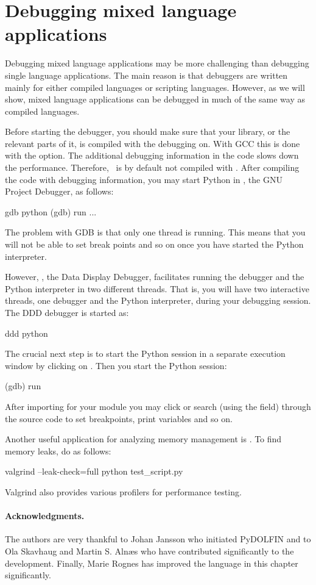 \section{Debugging mixed language applications}

Debugging mixed language applications may be more challenging than debugging
single language applications.  The main reason is that debuggers are written
mainly for either compiled languages or scripting languages. However, as
we will show, mixed language applications can be debugged in much of the same way
as compiled languages. 

Before starting the debugger, you should make sure that your library, 
or the relevant parts of it, 
is compiled with the debugging on. With GCC this is done with the 
option. The additional debugging information in the code slows down 
the performance. Therefore, \dolfin\ is by default not compiled with
.   
After compiling the code with debugging information, you may start 
Python in \citet{www:gdb}, the GNU Project Debugger, as follows:     
\begin{bash}
gdb python
(gdb) run
...
\end{bash}
The problem with GDB is that only one thread is running. This means that
you will not be able to set break points and so on once you have started
the Python interpreter.  

However, \citet{www:ddd}, the Data Display Debugger, facilitates running the debugger and the Python
interpreter in two different threads. That is, you will have two interactive
threads, one debugger and the Python interpreter,  during your debugging
session. The DDD debugger is started as:    
\begin{bash}
ddd python
\end{bash}
The crucial next step is to start the Python session in a separate
execution window by clicking on . 
Then you start the Python session: 
\begin{bash}
(gdb) run
\end{bash}
After importing for your module you may click or search (using the
 field)  through the  source code  
to  set breakpoints, print variables and so on. 

Another useful application for analyzing memory management is
\citet{www:valgrind}. To find memory leaks, do as follows:    
\begin{bash}
valgrind --leak-check=full python test_script.py
\end{bash}
Valgrind also provides various profilers for performance testing. 

\paragraph{Acknowledgments.}
The authors are very thankful to Johan Jansson who initiated PyDOLFIN and 
to Ola Skavhaug and Martin S. Aln\ae s who have contributed significantly to
the development.
Finally, Marie Rognes has improved the language in this chapter significantly. 

